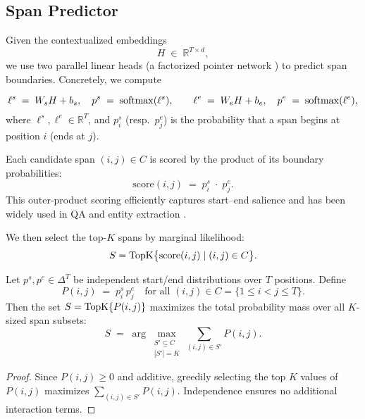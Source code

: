\subsection{Span Predictor}

Given the contextualized embeddings 
\[
H \;\in\;\mathbb{R}^{T\times d},
\]
we use two parallel linear heads (a factorized pointer network \cite{vinyals2015pointer}) to predict span boundaries. Concretely, we compute

\[
\ell^s \;=\; W_s H + b_s,\quad
p^s \;=\;\mathrm{softmax}(\ell^s), 
\qquad
\ell^e \;=\; W_e H + b_e,\quad
p^e \;=\;\mathrm{softmax}(\ell^e),
\]
where \(\ell^s,\ell^e\in\mathbb{R}^T\), and \(p^s_i\) (resp.\ \(p^e_j\)) is the probability that a span begins at position \(i\) (ends at \(j\)).  

Each candidate span \((i,j)\in C\) is scored by the product of its boundary probabilities:
\[
\mathrm{score}(i,j) 
\;=\; p^s_i \;\cdot\; p^e_j.
\]
This outer‐product scoring efficiently captures start–end salience and has been widely used in QA and entity extraction \cite{lee2016learning,xu2022faster}.  

We then select the top-\(K\) spans by marginal likelihood:
\[
S 
= \operatorname{TopK}\bigl\{\mathrm{score}(i,j)\mid (i,j)\in C\bigr\}.
\]

\begin{proposition}
	Let \(p^s,p^e\in\Delta^T\) be independent start/end distributions over \(T\) positions.  Define 
	\[
	P(i,j)\;=\;p^s_i\,p^e_j
	\quad
	\text{for all }(i,j)\in C=\{1\le i<j\le T\}.
	\]
	Then the set 
	\(
	S=\operatorname{TopK}\{P(i,j)\}
	\)
	maximizes the total probability mass over all \(K\)-sized span subsets:
	\[
	S
	\;=\;
	\arg\max_{\substack{S'\subseteq C\\|S'|=K}}
	\sum_{(i,j)\in S'}P(i,j).
	\]
\end{proposition}

\begin{proof}
	Since \(P(i,j)\ge0\) and additive, greedily selecting the top \(K\) values of \(P(i,j)\) maximizes \(\sum_{(i,j)\in S'}P(i,j)\).  Independence ensures no additional interaction terms.
\end{proof}